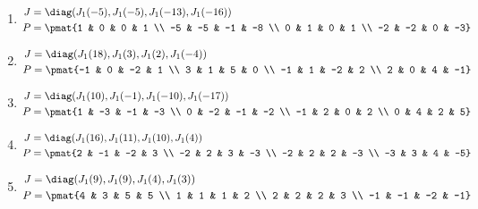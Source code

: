 \begin{enumerate}
\item

\begin{align*}
J &= \diag(J_{1}(-5), J_{1}(-5), J_{1}(-13), J_{1}(-16))\\
P &= \pmat{1 & 0 & 0 & 1 \\ -5 & -5 & -1 & -8 \\ 0 & 1 & 0 & 1 \\ -2 & -2 & 0 & -3}
\end{align*}

\item

\begin{align*}
J &= \diag(J_{1}(18), J_{1}(3), J_{1}(2), J_{1}(-4))\\
P &= \pmat{-1 & 0 & -2 & 1 \\ 3 & 1 & 5 & 0 \\ -1 & 1 & -2 & 2 \\ 2 & 0 & 4 & -1}
\end{align*}

\item

\begin{align*}
J &= \diag(J_{1}(10), J_{1}(-1), J_{1}(-10), J_{1}(-17))\\
P &= \pmat{1 & -3 & -1 & -3 \\ 0 & -2 & -1 & -2 \\ -1 & 2 & 0 & 2 \\ 0 & 4 & 2 & 5}
\end{align*}

\item

\begin{align*}
J &= \diag(J_{1}(16), J_{1}(11), J_{1}(10), J_{1}(4))\\
P &= \pmat{2 & -1 & -2 & 3 \\ -2 & 2 & 3 & -3 \\ -2 & 2 & 2 & -3 \\ -3 & 3 & 4 & -5}
\end{align*}

\item

\begin{align*}
J &= \diag(J_{1}(9), J_{1}(9), J_{1}(4), J_{1}(3))\\
P &= \pmat{4 & 3 & 5 & 5 \\ 1 & 1 & 1 & 2 \\ 2 & 2 & 2 & 3 \\ -1 & -1 & -2 & -1}
\end{align*}


\end{enumerate}
